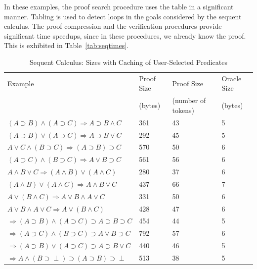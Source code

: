 \documentclass{acmconf}
\begin{document}
In these examples, the proof search procedure uses the table in a significant
manner. Tabling is used to detect loops in the goals considered by the
sequent calculus. The proof compression and the verification procedures
provide significant time speedups, since in these procedures, we already
know the proof. This is exhibited in Table~\ref{tab:seqtimes}.

\begin{table}[htbp]
\begin{center}
\begin{small}
\begin{tabular}{|l|l|l|l|}
\hline
Example & Proof Size & Proof Size & Oracle Size \\
& (bytes) & (number of tokens) & (bytes)\\
\hline
$(A\supset B)\wedge (A\supset C)\Rightarrow A\supset B\wedge C$
&	361 
&	43 
&	5 \\
$(A\supset B)\vee (A\supset C)\Rightarrow A\supset B\vee C$
&	292 
&	45 
&	5 \\
$A\vee C\wedge (B\supset C)\Rightarrow (A\supset B)\supset C$
&	570 
&	50 
&	6 \\
$(A\supset C)\wedge (B\supset C)\Rightarrow A\vee B\supset C$
&	561 
&	56 
&	6 \\
$A\wedge B\vee C\Rightarrow (A\wedge B)\vee (A\wedge C)$
&	280 
&	37 
&	6 \\
$(A\wedge B)\vee (A\wedge C)\Rightarrow A\wedge B\vee C$
&	437 
&	66 
&	7 \\
$A\vee (B\wedge C)\Rightarrow A\vee B\wedge A\vee C$
&	331 
&	50 
&	6 \\
$A\vee B\wedge A\vee C\Rightarrow A\vee (B\wedge C)$
&	428 
&	47 
&	6 \\
$\Rightarrow (A\supset B)\wedge (A\supset C)\supset A\supset B\supset C$
&	454 
&	44 
&	5 \\
$\Rightarrow (A\supset C)\wedge (B\supset C)\supset A\vee B\supset C$
&	792 
&	57 
&	6 \\
$\Rightarrow (A\supset B)\vee (A\supset C)\supset A\supset B\vee C$
&	440 
&	46 
&	5 \\
$\Rightarrow A\wedge (B\supset \perp)\supset (A\supset B)\supset \perp$ 
&	513 
&	38 
&	5 \\
\hline
\end{tabular}
\end{small}
\end{center}
\caption{\label{tab:seqsizes}
Sequent Calculus: Sizes with Caching of User-Selected Predicates}
\end{table}
\end{document}
